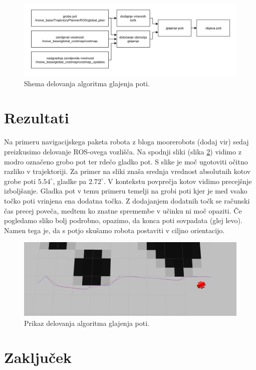 \documentclass[10pt,a4paper]{article}
\begin{document}
\begin{figure}[H]
	\centering
	\includegraphics[width=16cm]{pic/shema.png}
	\caption{Shema delovanja algoritma glajenja poti.}
	\label{fig:slika6}
\end{figure}

\section{Rezultati}

Na primeru navigacijskega paketa robota z bloga moorerobots (dodaj vir) sedaj preizkusimo delovanje ROS-ovega vozlišča. Na spodnji sliki (slika \ref{fig:slika7}) vidimo z modro označeno grobo pot ter rdečo gladko pot. S slike je moč ugotoviti očitno razliko v trajektoriji. Za primer na sliki znaša srednja vrednost absolutnih kotov grobe poti $5.54^{\circ} $, gladke pa $2.72^{\circ}$. V kontekstu povprečja kotov vidimo precejšnje izboljšanje. Gladka pot v temu primeru temelji na grobi poti kjer je med vsako točko poti vrinjena ena dodatna točka. Z dodajanjem dodatnih točk se računski čas precej poveča, medtem ko znatne spremembe v učinku ni moč opaziti. Če pogledamo sliko bolj podrobno, opazimo, da konca poti sovpadata (glej levo). Namen tega je, da s potjo skušamo robota postaviti v ciljno orientacijo.

\begin{figure}[H]
	\centering
	\includegraphics[width=16cm]{pic/preizkus_k.png}
	\caption{Prikaz delovanja algoritma glajenja poti.}
	\label{fig:slika7}
\end{figure}

\section{Zaključek}
\end{document}
